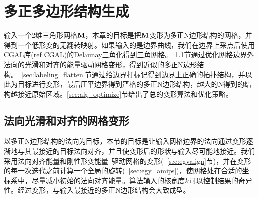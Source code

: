 \chapter{多正多边形结构生成} \label{chap:polyquad}
输入一个2维三角形网格$\mathbf{M}$，本章的目标是把$\mathbf{M}$变形为多正N边形结构的网格，并得到一个低形变的无翻转映射。如果输入的是边界曲线，我们在边界上采点后使用CGAL库(ref CGAL)的Delaunay三角化得到三角网格。~\ref{sec:smooth_align}节通过优化网格边界外法向的光滑和对齐的能量驱动网格变形，得到近似的多正N边形结构。~\ref{sec:labeling_flatten}节通过给边界打标记得到边界上正确的拓扑结构，并以此为目标进行变形，最后压平边界得到严格的多正N边形结构，越大的N得到的结构越接近原始区域。\ref{sec:alg_optimize}节给出了总的变形算法和优化策略。

\section{法向光滑和对齐的网格变形} \label{sec:smooth_align}
以多正N边形结构的法向为目标，本节的目标是让输入网格边界的法向通过变形逐渐地与其最接近的目标法向对齐，并且使变形后的形状与输入尽可能地接近。我们采用法向对齐能量和刚性形变能量~\cite{Fu2015}驱动网格的变形(~\ref{sec:egyalign}节)，并在变形的每一次迭代之前计算一个全局的旋转(~\ref{sec:egy_amips})，使网格处在合适的坐标系中，尽量减小初始的法向对齐能量。算法输入的核宽度$k$可以控制结果的奇异性。经过变形，与输入最接近的多正N边形结构会大致成型。

